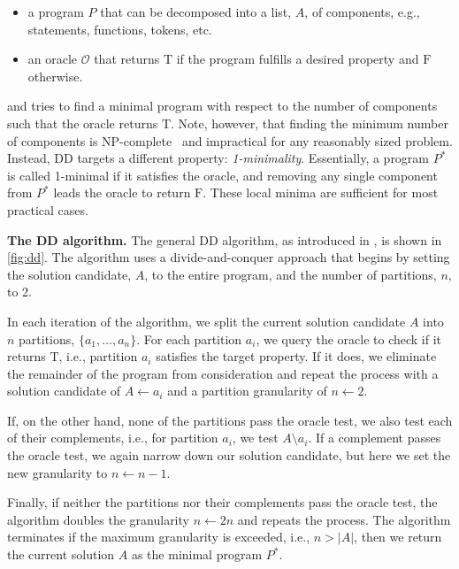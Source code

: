\documentclass[sigplan,nonacm]{acmart}
\newenvironment{vinlist}
{\begin{itemize}[leftmargin=1.5em]
  \setlength{\itemsep}{0pt}
  \setlength{\labelwidth}{0.75em}
\setlength{\parsep}{0pt}
\setlength{\topsep}{0pt}
  \setlength{\partopsep}{0pt}
  }
{\end{itemize}}
\newcommand{\heading}[1]{\vspace{4pt}\noindent\textbf{#1.}}
\begin{document}
\begin{vinlist}
    \item a program $P$ that can be decomposed into a list, $A$, of components, e.g., statements, functions, tokens, etc.
    \item an oracle $\mathcal{O}$ that returns $\mathrm{T}$ if the program fulfills a desired property and $\mathrm{F}$ otherwise.
\end{vinlist}
and tries to find a minimal program with respect to the number of components such that the oracle returns $\mathrm{T}$.
Note, however, that finding the minimum number of components is NP-complete~\cite{delta2002} and impractical for any reasonably sized problem.
Instead, DD targets a different property: \textit{1-minimality}.
Essentially, a program $P^{*}$ is called 1-minimal if it satisfies the oracle, and removing any single component from $P^{*}$ leads the oracle to return $\mathrm{F}$.
These local minima are sufficient for most practical cases.





\heading{The DD algorithm}
The general DD algorithm, as introduced in \cite{deltarl2018}, is shown in \cref{fig:dd}.
The algorithm uses a divide-and-conquer approach that begins by setting the solution candidate, $A$, to the entire program, and the number of partitions, $n$, to 2.

In each iteration of the algorithm, we split the current solution candidate $A$ into $n$ partitions, $\{a_1, \dots, a_n\}$.
For each partition $a_i$, we query the oracle to check if it returns $\mathrm{T}$, i.e., partition $a_i$ satisfies the target property.
If it does, we eliminate the remainder of the program from consideration and repeat the process with a solution candidate of $A \gets a_i$ and a partition granularity of $n \gets 2$.

If, on the other hand, none of the partitions pass the oracle test, we also test each of their complements, i.e., for partition $a_i$, we test $A\setminus a_i$.
If a complement passes the oracle test, we again narrow down our solution candidate, but here we set the new granularity to $n \gets n - 1$.

Finally, if neither the partitions nor their complements pass the oracle test, the algorithm doubles the granularity $n \gets 2n$ and repeats the process.
The algorithm terminates if the maximum granularity is exceeded, i.e., $n > |A|$, then we return the current solution $A$ as the minimal program $P^{*}$.
\end{document}
